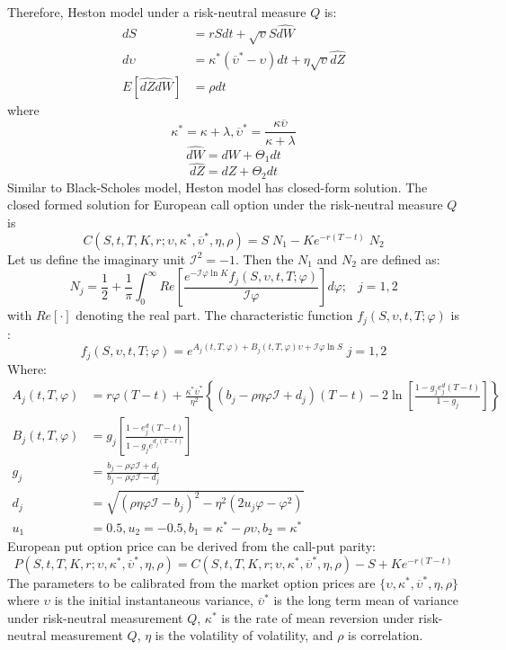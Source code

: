 \documentclass[letterpaper,12pt,titlepage,oneside,final]{book}
\numberwithin{equation}{section}
\theoremstyle{definition}
\begin{document}
Therefore, Heston model under a risk-neutral measure $Q$ is:
\begin{equation}
\begin{split}
dS&=r S dt + \sqrt{\upsilon} S \hat{dW}\\
d\upsilon&=\kappa^*(\overline{\upsilon}^*-\upsilon)dt+\eta \sqrt{\upsilon}\hat{dZ}\\
E[\hat{dZ}\hat{dW}]&=\rho dt
\end{split}
\label{eq:hestonNeutral}
\end{equation}
where
\[
\kappa^*=\kappa+\lambda, \overline{\upsilon}^*=\frac{\kappa \overline{\upsilon}}{\kappa+\lambda}
\]
\[
\hat{dW}=dW+\Theta_1 dt
\]
\[
\hat{dZ}=dZ+\Theta_2 dt
\]
Similar to Black-Scholes model, Heston model has closed-form solution. The closed formed solution for European call option under  the risk-neutral measure $Q$ is
\[
C(S,t,T,K,r;\upsilon,\kappa^*,\overline{\upsilon}^*,\eta,\rho)=S\; N_1-Ke^{-r(T-t)} \; N_2
\]
Let us define the imaginary unit $\mathcal{I}^2=-1$. Then the $N_1$ and $N_2$ are defined as:
\[
N_j=\frac{1}{2}+\frac{1}{\pi}\int_{0}^{\infty} Re \left[\frac{e^{-\mathcal{I} \varphi \ln{K}} f_j(S,\upsilon,t,T;\varphi)} {\mathcal{I}\varphi} \right] d\varphi;\;\;\ j=1,2
\] with $Re[\cdot]$ denoting the real part.
The characteristic function $f_j(S,\upsilon,t,T;\varphi)$ is :
\[
f_j(S,\upsilon,t,T;\varphi)=e^{A_j(t,T,\varphi)+B_j(t,T,\varphi)\upsilon+\mathcal{I} \varphi \ln{S}}\; j=1,2
\]
Where:
\[
\begin{split}
A_j(t,T,\varphi)&=r \varphi (T-t)+ \frac{\kappa^* \overline{\upsilon}^*}{\eta^2}\left\{(b_j-\rho \eta \varphi \mathcal{I}+ d_j) (T-t)- 2\ln{\left[ \frac{1-g_je^d_j(T-t)}{1-g_j}\right]}     \right\}\\
B_j(t,T,\varphi)&=g_j\left[ \frac{1-e^d_j(T-t)}{1-g_je^{d_j(T-t)}}\right] \\
g_j&=\frac{b_j-\rho\varphi \mathcal{I}+d_j}{b_j-\rho\varphi \mathcal{I}-d_j}\\
d_j&=\sqrt{(\rho \eta \varphi \mathcal{I}-b_j)^2-\eta^2(2 u_j \varphi- \varphi^2)}\\
u_1&=0.5, u_2=-0.5, b_1=\kappa^*-\rho \upsilon, b_2=\kappa^*
\end{split}
\]
European put option price can be derived from the call-put parity:
\[
P(S,t,T,K,r;\upsilon,\kappa^*,\overline{\upsilon}^*,\eta,\rho)=C(S,t,T,K,r;\upsilon,\kappa^*,\overline{\upsilon}^*,\eta,\rho)-S+K e^{-r(T-t)}
\]
The parameters to be calibrated from the market option prices are $\{\upsilon,\kappa^*,\overline{\upsilon}^*,\eta,\rho\}$ where $\upsilon$ is the initial instantaneous variance, $\overline{\upsilon}^*$ is the long term mean of variance under risk-neutral measurement $Q$, $\kappa^*$ is the rate of mean reversion under risk-neutral measurement $Q$, $\eta$ is the volatility of volatility, and $\rho$ is correlation.
\end{document}
